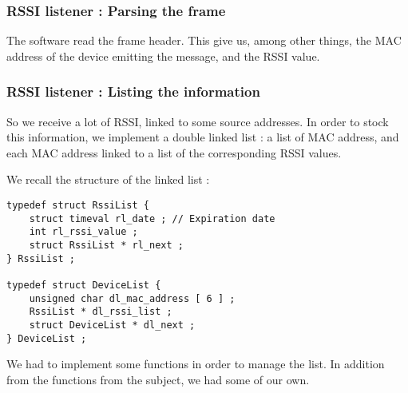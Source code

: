 \subsubsection{RSSI listener : Parsing the frame}

The software read the frame header. This give us, among other things,
the MAC address of the device emitting the message, and the RSSI value.

\subsubsection{RSSI listener : Listing the information}

So we receive a lot of RSSI, linked to some source addresses. In order to stock
this information, we implement a double linked list : a list of MAC address,
and each MAC address linked to a list of the corresponding RSSI values.

We recall the structure of the linked list : 

\begin{lstlisting} 
typedef struct RssiList {
	struct timeval rl_date ; // Expiration date
	int rl_rssi_value ;
	struct RssiList * rl_next ;
} RssiList ;

typedef struct DeviceList {
	unsigned char dl_mac_address [ 6 ] ;
	RssiList * dl_rssi_list ;
	struct DeviceList * dl_next ;
} DeviceList ;
\end{lstlisting}

We had to implement some functions in order to manage the list. In addition
from the functions from the subject, we had some of our own.

